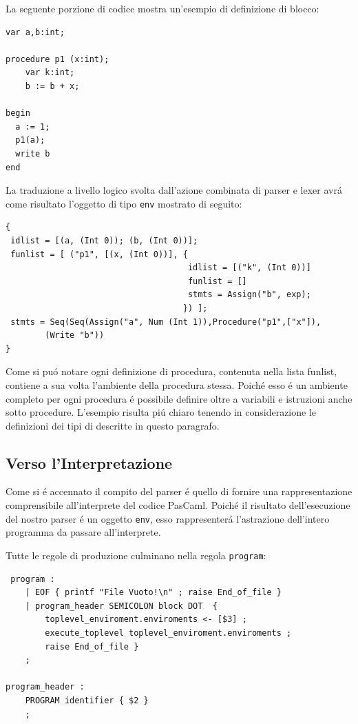 \documentclass[a4paper,10pt]{article}
\begin{document}
La seguente porzione di codice mostra un'esempio di definizione di blocco:
\begin{verbatim}
var a,b:int;

procedure p1 (x:int);
    var k:int;
    b := b + x;

begin
  a := 1;
  p1(a);
  write b
end
\end{verbatim}

La traduzione a livello logico svolta dall'azione combinata di parser e lexer
avr\'a come risultato l'oggetto di tipo \texttt{env} mostrato di seguito:
\begin{verbatim}
{
 idlist = [(a, (Int 0)); (b, (Int 0))];
 funlist = [ ("p1", [(x, (Int 0))], {
                                     idlist = [("k", (Int 0))]
                                     funlist = []
                                     stmts = Assign("b", exp);
                                    }) ];
 stmts = Seq(Seq(Assign("a", Num (Int 1)),Procedure("p1",["x"]),
        (Write "b"))
}
\end{verbatim}

Come si pu\'o notare ogni definizione di procedura, contenuta nella lista
funlist, contiene a sua volta l'ambiente della procedura stessa.
Poich\'e esso \'e un ambiente completo per ogni procedura \'e possibile
definire oltre a variabili e istruzioni anche sotto procedure. L'esempio
risulta pi\'u chiaro tenendo in considerazione le definizioni dei tipi di
descritte in questo paragrafo.

\subsection{Verso l'Interpretazione}
Come si \'e accennato il compito del parser \'e quello di fornire una
rappresentazione comprensibile all'interprete del codice PasCaml. Poich\'e il
risultato dell'esecuzione del nostro parser \'e un oggetto \texttt{env}, esso
rappresenter\'a l'astrazione dell'intero programma da passare all'interprete.

Tutte le regole di produzione culminano nella regola \texttt{program}:

\begin{verbatim}
 program :
    | EOF { printf "File Vuoto!\n" ; raise End_of_file }
    | program_header SEMICOLON block DOT  {
        toplevel_enviroment.enviroments <- [$3] ;
        execute_toplevel toplevel_enviroment.enviroments ;
        raise End_of_file }
    ;

program_header :
    PROGRAM identifier { $2 }
    ;
\end{verbatim}
\end{document}
